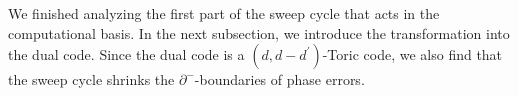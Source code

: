 We finished analyzing the first part of the sweep cycle that acts in the computational basis. In the next subsection, we introduce the transformation into the dual code. Since the dual code is a $(d,d-d^{\prime})$-Toric code, we also find that the sweep cycle shrinks the $\partial^{-}$-boundaries of phase errors.





%
%
%
%
